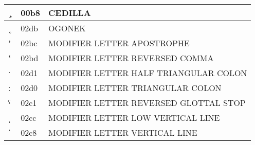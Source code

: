 \documentclass[12pt,letterpaper,openany]{book}
\begin{document}
\begin{center}
\begin{supertabular}{|m{0.25in}|m{0.5in}|m{4in}|}
¸ & 00b8 & CEDILLA\\\hline
˛ & 02db & OGONEK\\\hline
ʼ & 02bc & MODIFIER LETTER APOSTROPHE\\\hline
ʽ & 02bd & MODIFIER LETTER REVERSED COMMA\\\hline
ˑ & 02d1 & MODIFIER LETTER HALF TRIANGULAR COLON\\\hline
ː & 02d0 & MODIFIER LETTER TRIANGULAR COLON\\\hline
ˁ & 02c1 & MODIFIER LETTER REVERSED GLOTTAL STOP\\\hline
ˌ & 02cc & MODIFIER LETTER LOW VERTICAL LINE\\\hline
ˈ & 02c8 & MODIFIER LETTER VERTICAL LINE\\\hline
\end{supertabular}
\end{center}
\end{document}

